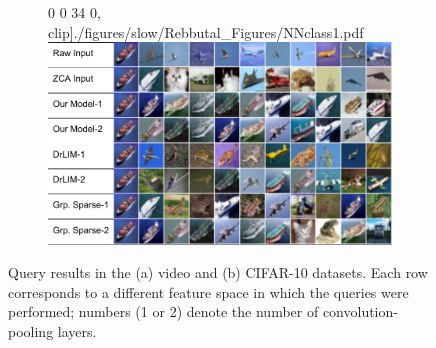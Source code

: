 \begin{figure}
\begin{subfigure}[b]{0.45\textwidth}
0 0 34 0, clip]{./figures/slow/Rebbutal_Figures/NNclass1.pdf}
\includegraphics[width=\textwidth, trim = 0 0 34 0,
clip]{./figures/slow/Rebbutal_Figures/NNclass2.pdf} \caption{} \label{fig:cifarquery}
\end{subfigure} \caption{Query results in the (a) video and (b) CIFAR-10
datasets. Each row corresponds to a different feature space in which the
queries were performed; numbers (1 or 2) denote the number of
convolution-pooling layers. \label{fig:query}}  \label{fig:query} \end{figure}

